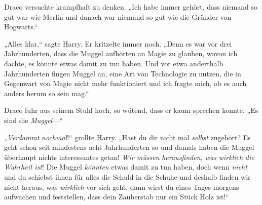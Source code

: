 Draco versuchte krampfhaft zu denken. „Ich habe immer gehört, dass niemand so gut war wie Merlin und danach war niemand so gut wie die Gründer von Hogwarts.“

„Alles klar,“ sagte Harry. Er kritzelte immer noch. „Denn es war vor drei Jahrhunderten, dass die Muggel aufhörten an Magie zu glauben, wovon ich dachte, es könnte etwas damit zu tun haben. Und vor etwa anderthalb Jahrhunderten fingen Muggel an, eine Art von Technologie zu nutzen, die in Gegenwart von Magie nicht mehr funktioniert und ich fragte mich, ob es auch anders herum so sein mag.“

Draco fuhr aus seinem Stuhl hoch, so wütend, dass er kaum sprechen konnte. „Es sind die \emph{Muggel—}“

„\emph{Verdammt} \emph{nochmal}!“ grollte Harry. „Hast du dir nicht mal \emph{selbst} zugehört? Es geht schon seit mindestens acht Jahrhunderten so und damals haben die Muggel überhaupt nichts interessantes getan! \emph{Wir müssen} \emph{herausfinden, was} \emph{wirklich} \emph{die} \emph{Wahrheit} \emph{ist}! Die Muggel \emph{könnten} etwas damit zu tun haben, doch wenn \emph{nicht} und du schiebst ihnen für alles die Schuld in die Schuhe und deshalb finden wir nicht heraus, was \emph{wirklich} vor sich geht, dann wirst du eines Tages morgens aufwachen und feststellen, dass dein Zauberstab nur ein Stück Holz ist!“

